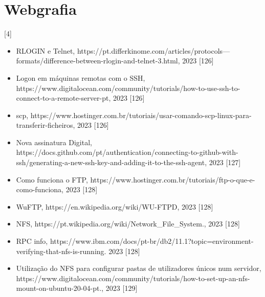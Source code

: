 \documentclass[12pt, a4paper]{article}
\begin{document}
	\section*{Webgrafia} [4]
	\begin{itemize}
		\item RLOGIN e Telnet, https://pt.differkinome.com/articles/protocols—formats/difference-between-rlogin-and-telnet-3.html, 2023 [126]
		\item Logon em máquinas remotas com o SSH, https://www.digitalocean.com/community/tutorials/how-to-use-ssh-to-connect-to-a-remote-server-pt, 2023 [126]
		\item scp, https://www.hostinger.com.br/tutoriais/usar-comando-scp-linux-para-transferir-ficheiros, 2023 [126]
		\item Nova assinatura Digital, https://docs.github.com/pt/authentication/connecting-to-github-with-ssh/generating-a-new-ssh-key-and-adding-it-to-the-ssh-agent, 2023 [127]
		\item Como funciona o FTP,  https://www.hostinger.com.br/tutoriais/ftp-o-que-e-como-funciona, 2023 [128]
		\item WuFTP,  https://en.wikipedia.org/wiki/WU-FTPD, 2023 [128]
		\item NFS, https://pt.wikipedia.org/wiki/Network\_File\_System., 2023 [128]
		\item RPC info, https://www.ibm.com/docs/pt-br/db2/11.1?topic=environment-verifying-that-nfs-is-running. 2023 [128]
		\item Utilização do NFS para configurar pastas de utilizadores únicos num servidor, https://www.digitalocean.com/community/tutorials/how-to-set-up-an-nfs-mount-on-ubuntu-20-04-pt., 2023 [129]
	\end{itemize}
	
\end{document}
